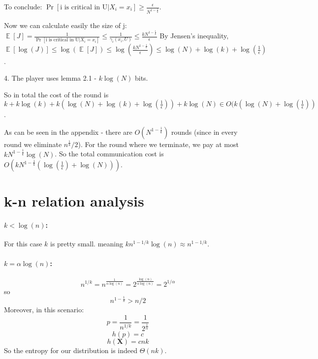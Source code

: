 \documentclass{article}
\newcommand{\rv}[1]{\mathbf{#1}}
\theoremstyle{plain}
\begin{document}
To conclude: $\Pr[\text{i is critical in U}| X_i = x_i] \geq \frac{\epsilon}{N^{1-\frac{1}{k}}}$. \newline

Now we can calculate easily the size of j: \newline
$ \mathop{\mathbb{E}} [J] = \frac{1}{\Pr[\text{i is critical in U}| X_i = x_i]} \leq \frac{1}{\gamma_i(x_i, U)} \leq \frac{kN^{1-\frac{1}{k}}}{\epsilon}$ \newline
By Jensen's inequality, $\mathop{\mathbb{E}} [\log(J)] \leq \log(\mathop{\mathbb{E}} [J]) \leq \log(\frac{kN^{1-\frac{1}{k}}}{\epsilon}) \leq \log(N) + \log(k) + \log(\frac{1}{\epsilon})$.  \newline

4. The player uses lemma 2.1 - $k\log(N)$ bits.

So in total the cost of the round is $k + k\log(k) + k(\log(N) + \log(k) + \log(\frac{1}{\epsilon})) + k\log(N) \in O(k(\log(N) + \log(\frac{1}{\epsilon}))$.

As can be seen in the appendix - there are $O(N^{1-\frac{1}{k}})$ rounds (since in every round we eliminate $n^{\frac{1}{k}}/2$). \newline
For the round where we terminate, we pay at most $kN^{1-\frac{1}{k}} \log(N)$. \newline
So the total communication cost is  $O(kN^{1-\frac{1}{k}}(\log(\frac{1}{\epsilon}) + \log(N)))$.
\section{k-n relation analysis}
\paragraph{$k < \log(n)$:}
For this case $k$ is pretty small. meaning $kn^{1-1/k}\log(n) \approx n^{1-1/k}$. 
\paragraph{$k = \alpha\log(n)$:}
\begin{equation*}
    n^{1/k} = n^{\frac{1}{\alpha\log(n)}} = 2^{\frac{\log(n)}{\alpha\log(n)}} = 2^{1/\alpha}
\end{equation*}
so
\begin{equation*}
    n^{1-\frac{1}{k}} > n/2
\end{equation*}
Moreover, in this scenario:
\begin{equation*}
    p = \frac{1}{n^{1/k}} = \frac{1}{2^{\frac{1}{\alpha}}} 
\end{equation*}
\begin{equation*}
    h(p) = c 
\end{equation*}
\begin{equation*}
    h(\rv{X}) = cnk
\end{equation*}
So the entropy for our distribution is indeed $\Theta(nk)$.
\end{document}
